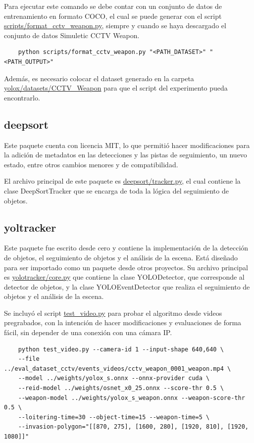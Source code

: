 \documentclass[11pt,a4paper]{article}
\begin{document}
Para ejecutar este comando se debe contar con un conjunto de datos de entrenamiento en formato COCO, el cual se puede generar con el script \url{scripts/format_cctv_weapon.py}, siempre y cuando se haya descargado el conjunto de datos Simuletic CCTV Weapon.

\begin{verbatim}
    python scripts/format_cctv_weapon.py "<PATH_DATASET>" "<PATH_OUTPUT>"
\end{verbatim}

Además, es necesario colocar el dataset generado en la carpeta \url{yolox/datasets/CCTV_Weapon} para que el script del experimento pueda encontrarlo.

\subsection{deepsort}

Este paquete cuenta con licencia MIT, lo que permitió hacer modificaciones para la adición de metadatos en las detecciones y las pistas de seguimiento, un nuevo estado, entre otros cambios menores y de compatibilidad.

El archivo principal de este paquete es \url{deepsort/tracker.py}, el cual contiene la clase DeepSortTracker que se encarga de toda la lógica del seguimiento de objetos.

\subsection{yoltracker}

Este paquete fue escrito desde cero y contiene la implementación de la detección de objetos, el seguimiento de objetos y el análisis de la escena. Está diseñado para ser importado como un paquete desde otros proyectos. Su archivo principal es \url{yolotracker/core.py} que contiene la clase YOLODetector, que corresponde al detector de objetos, y la clase YOLOEventDetector que realiza el seguimiento de objetos y el análisis de la escena.

Se incluyó el script \url{test_video.py} para probar el algoritmo desde videos pregrabados, con la intención de hacer modificaciones y evaluaciones de forma fácil, sin depender de una conexión con una cámara IP.

\begin{verbatim}
    python test_video.py --camera-id 1 --input-shape 640,640 \
    --file ../eval_dataset_cctv/events_videos/cctv_weapon_0001_weapon.mp4 \
    --model ../weights/yolox_s.onnx --onnx-provider cuda \
    --reid-model ../weights/osnet_x0_25.onnx --score-thr 0.5 \
    --weapon-model ../weights/yolox_s_weapon.onnx --weapon-score-thr 0.5 \
    --loitering-time=30 --object-time=15 --weapon-time=5 \
    --invasion-polygon="[[870, 275], [1600, 280], [1920, 810], [1920, 1080]]"
\end{verbatim}
\end{document}
